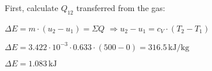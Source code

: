 First, calculate \( Q_{12} \) transferred from the gas:  

\( \Delta E = m \cdot (u_2 - u_1) = \Sigma Q \)  
\( \Rightarrow u_2 - u_1 = c_V \cdot (T_2 - T_1) \)  

\( \Delta E = 3.422 \cdot 10^{-3} \cdot 0.633 \cdot (500 - 0) = 316.5 \, \text{kJ/kg} \)  

\( \Delta E = 1.083 \, \text{kJ} \)